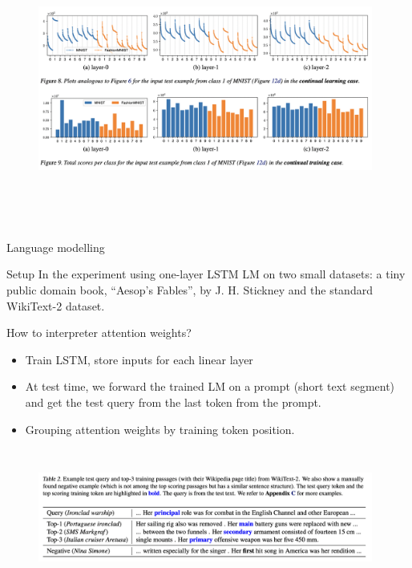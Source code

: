 \documentclass{beamer}
\begin{document}
\begin{frame}
\begin{figure}[h]
    \centering
    \includegraphics[width=11cm, height=9cm]{Continual_learning_sample.png}
\end{figure}    
\end{frame}

\begin{frame}{Language modelling}
    \begin{block}{Setup}
        In the experiment using one-layer LSTM LM on two small datasets: a tiny public domain book, “Aesop’s Fables”, by J. H. Stickney and the standard WikiText-2 dataset.
    \end{block}
    \begin{block}{How to interpreter attention weights?}
        \begin{itemize}
            \item Train LSTM, store inputs for each linear layer
            \item At test time, we forward the trained LM on a prompt (short text segment) and get the test query from the last token from the prompt.
            \item Grouping attention weights by training token position.
        \end{itemize}
    \end{block}
\end{frame}

\begin{frame}
    \begin{figure}[h]
    \centering
    \includegraphics[width=11cm, height=4.5cm]{NLP_sample.png}
\end{figure} 
\end{frame}
\end{document}
